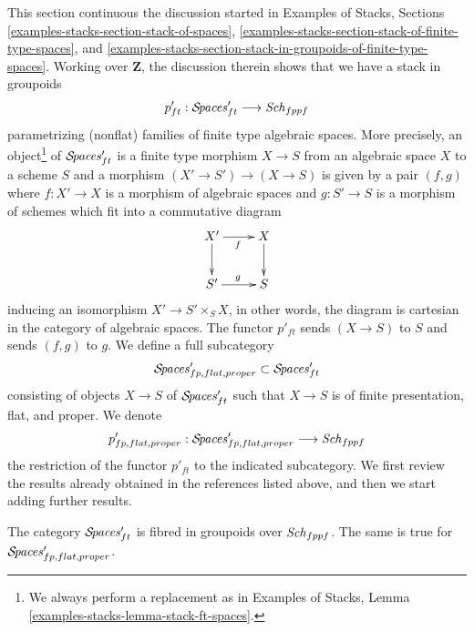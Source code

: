 \noindent
This section continuous the discussion started in
Examples of Stacks, Sections
\ref{examples-stacks-section-stack-of-spaces},
\ref{examples-stacks-section-stack-of-finite-type-spaces}, and
\ref{examples-stacks-section-stack-in-groupoids-of-finite-type-spaces}.
Working over $\mathbf{Z}$, the discussion therein shows
that we have a stack in groupoids
$$
p'_{ft} : \mathcal{S}\!\mathit{paces}'_{ft} \longrightarrow \mathit{Sch}_{fppf}
$$
parametrizing (nonflat) families of finite type algebraic spaces.
More precisely, an object\footnote{We always perform a replacement as in
Examples of Stacks, Lemma \ref{examples-stacks-lemma-stack-ft-spaces}.}
of $\mathcal{S}\!\mathit{paces}'_{ft}$ is a finite type morphism $X \to S$
from an algebraic space $X$ to a scheme $S$ and a morphism
$(X' \to S') \to (X \to S)$ is given by a pair $(f, g)$
where $f : X' \to X$ is a morphism of algebraic spaces
and $g : S' \to S$ is a morphism of schemes
which fit into a commutative diagram
$$
\xymatrix{
X' \ar[d] \ar[r]_f & X \ar[d] \\
S' \ar[r]^g & S
}
$$
inducing an isomorphism $X' \to S' \times_S X$, in other words, the
diagram is cartesian in the category of algebraic spaces.
The functor $p'_{ft}$ sends $(X \to S)$ to $S$ and sends
$(f, g)$ to $g$. We define a full subcategory
$$
\mathcal{S}\!\mathit{paces}'_{fp, flat, proper} \subset
\mathcal{S}\!\mathit{paces}'_{ft}
$$
consisting of objects $X \to S$ of $\mathcal{S}\!\mathit{paces}'_{ft}$
such that $X \to S$ is of finite presentation, flat, and proper.
We denote
$$
p'_{fp, flat, proper} :
\mathcal{S}\!\mathit{paces}'_{fp, flat, proper}
\longrightarrow
\mathit{Sch}_{fppf}
$$
the restriction of the functor $p'_{ft}$ to the indicated subcategory.
We first review the results already obtained in the references
listed above, and then we start adding further results.

\begin{lemma}
\label{lemma-spaces-fibred-in-groupoids}
The category $\mathcal{S}\!\mathit{paces}'_{ft}$ is fibred in groupoids
over $\mathit{Sch}_{fppf}$. The same is true for
$\mathcal{S}\!\mathit{paces}'_{fp, flat, proper}$.
\end{lemma}

